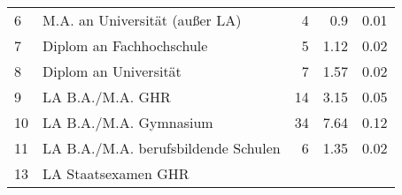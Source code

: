 \begin{longtable}{lXrrr}
     6 &
     \multicolumn{1}{X}{ M.A. an Universität (außer LA)   } &


       \num{4} &
       \num[round-mode=places,round-precision=2]{0.9} &
         \num[round-mode=places,round-precision=2]{0.01} \\

     7 &
     \multicolumn{1}{X}{ Diplom an Fachhochschule   } &


       \num{5} &
       \num[round-mode=places,round-precision=2]{1.12} &
         \num[round-mode=places,round-precision=2]{0.02} \\

     8 &
     \multicolumn{1}{X}{ Diplom an Universität   } &


       \num{7} &
       \num[round-mode=places,round-precision=2]{1.57} &
         \num[round-mode=places,round-precision=2]{0.02} \\

     9 &
     \multicolumn{1}{X}{ LA B.A./M.A. GHR   } &


       \num{14} &
       \num[round-mode=places,round-precision=2]{3.15} &
         \num[round-mode=places,round-precision=2]{0.05} \\

     10 &
     \multicolumn{1}{X}{ LA B.A./M.A. Gymnasium   } &


       \num{34} &
       \num[round-mode=places,round-precision=2]{7.64} &
         \num[round-mode=places,round-precision=2]{0.12} \\

     11 &
     \multicolumn{1}{X}{ LA B.A./M.A. berufsbildende Schulen   } &


       \num{6} &
       \num[round-mode=places,round-precision=2]{1.35} &
         \num[round-mode=places,round-precision=2]{0.02} \\

     13 &
     \multicolumn{1}{X}{ LA Staatsexamen GHR   } &



\end{longtable}
